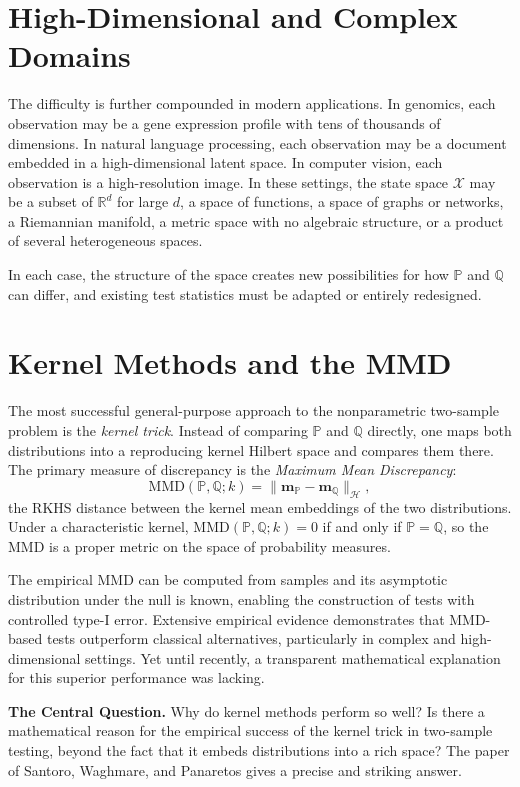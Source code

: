 \documentclass[12pt, oneside]{book}
\theoremstyle{plain}
\theoremstyle{definition}
\newcommand{\R}{\mathbb{R}}
\newcommand{\calH}{\mathcal{H}}
\newcommand{\calX}{\mathcal{X}}
\newcommand{\PP}{\mathbb{P}}
\newcommand{\QQ}{\mathbb{Q}}
\newcommand{\mP}{\mathbf{m}_{\PP}}
\newcommand{\mQ}{\mathbf{m}_{\QQ}}
\newcommand{\MMD}{\mathrm{MMD}}
\begin{document}
\section{High-Dimensional and Complex Domains}

The difficulty is further compounded in modern applications. In genomics, each observation may be a gene expression profile with tens of thousands of dimensions. In natural language processing, each observation may be a document embedded in a high-dimensional latent space. In computer vision, each observation is a high-resolution image. In these settings, the state space $\calX$ may be a subset of $\R^d$ for large $d$, a space of functions, a space of graphs or networks, a Riemannian manifold, a metric space with no algebraic structure, or a product of several heterogeneous spaces.

In each case, the structure of the space creates new possibilities for how $\PP$ and $\QQ$ can differ, and existing test statistics must be adapted or entirely redesigned.

\section{Kernel Methods and the MMD}

The most successful general-purpose approach to the nonparametric two-sample problem is the \emph{kernel trick}. Instead of comparing $\PP$ and $\QQ$ directly, one maps both distributions into a reproducing kernel Hilbert space and compares them there. The primary measure of discrepancy is the \emph{Maximum Mean Discrepancy}:
\begin{equation}
\MMD(\PP, \QQ; k) = \|\mP - \mQ\|_{\calH},
\label{eq:mmd}
\end{equation}
the RKHS distance between the kernel mean embeddings of the two distributions. Under a characteristic kernel, $\MMD(\PP, \QQ; k) = 0$ if and only if $\PP = \QQ$, so the MMD is a proper metric on the space of probability measures.

The empirical MMD can be computed from samples and its asymptotic distribution under the null is known, enabling the construction of tests with controlled type-I error. Extensive empirical evidence demonstrates that MMD-based tests outperform classical alternatives, particularly in complex and high-dimensional settings. Yet until recently, a transparent mathematical explanation for this superior performance was lacking.

\begin{highlightbox}
\textbf{The Central Question.} Why do kernel methods perform so well? Is there a mathematical reason for the empirical success of the kernel trick in two-sample testing, beyond the fact that it embeds distributions into a rich space? The paper of Santoro, Waghmare, and Panaretos gives a precise and striking answer.
\end{highlightbox}
\end{document}
